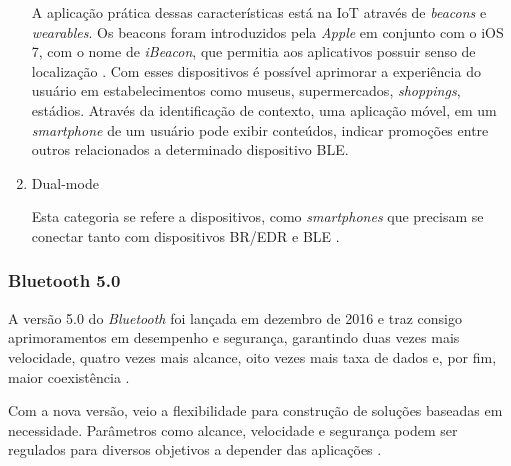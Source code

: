 \begin{enumerate}[label=(\Alph*)]
    A aplicação prática dessas características está na IoT através de \textit{beacons} e \textit{wearables}. Os beacons foram introduzidos pela \textit{Apple}\textsuperscript{\textregistered} em conjunto com o iOS 7, com o nome de \textit{iBeacon}, que permitia aos aplicativos possuir senso de localização \cite{Apple2014}. Com esses dispositivos é possível aprimorar a experiência do usuário em estabelecimentos como museus, supermercados, \textit{shoppings}, estádios. Através da identificação de contexto, uma aplicação móvel, em um \textit{smartphone} de um usuário pode exibir conteúdos, indicar promoções entre outros relacionados a determinado dispositivo BLE.
    
    \item{Dual-mode}
    
    Esta categoria se refere a dispositivos, como \textit{smartphones} que precisam se conectar tanto com dispositivos BR/EDR e BLE \cite{BluetoothSIG2017a}.

\end{enumerate}


\subsubsection{Bluetooth 5.0}

A versão 5.0 do \textit{Bluetooth} foi lançada em dezembro de 2016 e traz consigo aprimoramentos em desempenho e segurança, garantindo duas vezes mais velocidade, quatro vezes mais alcance, oito vezes mais taxa de dados e, por fim, maior coexistência \cite{BluetoothSIG2017b}. 

Com a nova versão, veio a flexibilidade para construção de soluções baseadas em necessidade. Parâmetros como alcance, velocidade e segurança podem ser regulados para diversos objetivos a depender das aplicações \cite{BluetoothSIG2017b}.



